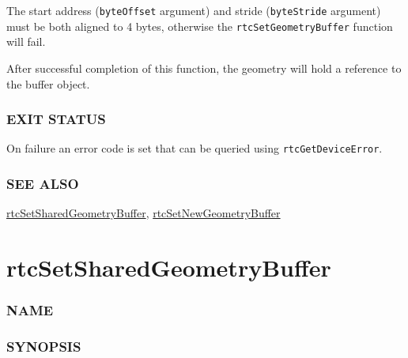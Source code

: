 The start address (\texttt{byteOffset} argument) and stride
(\texttt{byteStride} argument) must be both aligned to 4 bytes,
otherwise the \texttt{rtcSetGeometryBuffer} function will fail.

After successful completion of this function, the geometry will hold a
reference to the buffer object.

\subsubsection{EXIT STATUS}\label{exit-status}

On failure an error code is set that can be queried using
\texttt{rtcGetDeviceError}.

\subsubsection{SEE ALSO}\label{see-also}

\hyperref[rtcsetsharedgeometrybuffer]{rtcSetSharedGeometryBuffer},
\hyperref[rtcsetnewgeometrybuffer]{rtcSetNewGeometryBuffer}

\pagebreak

\section{rtcSetSharedGeometryBuffer}\label{rtcsetsharedgeometrybuffer}

\subsubsection{NAME}\label{name}

\begin{Shaded}
\begin{Highlighting}[]
\OperatorTok{{-}}
\end{Highlighting}
\end{Shaded}

\subsubsection{SYNOPSIS}\label{synopsis}

\begin{Shaded}
\begin{Highlighting}[]

\OperatorTok{(}
\OperatorTok{,}
  \OperatorTok{,}
   \OperatorTok{,}
  \OperatorTok{,}
   \OperatorTok{*}\OperatorTok{,}
  \OperatorTok{,}
  \OperatorTok{,}
\OperatorTok{);}
\end{Highlighting}
\end{Shaded}

